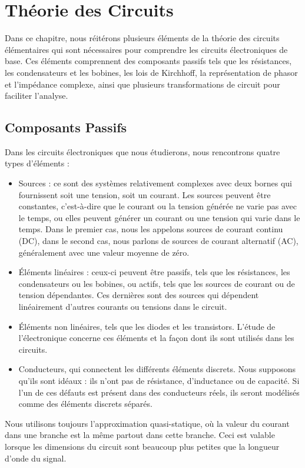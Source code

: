 \chapter{Théorie des Circuits}

Dans ce chapitre, nous réitérons plusieurs éléments de la théorie des circuits élémentaires qui sont nécessaires pour comprendre les circuits électroniques de base. Ces éléments comprennent des composants passifs tels que les résistances, les condensateurs et les bobines, les lois de Kirchhoff, la représentation de phasor et l'impédance complexe, ainsi que plusieurs transformations de circuit pour faciliter l'analyse.

\section{Composants Passifs}
Dans les circuits électroniques que nous étudierons, nous rencontrons quatre types d'éléments :
\begin{itemize}
	\item Sources : ce sont des systèmes relativement complexes avec deux bornes qui fournissent soit une tension, soit un courant. Les sources peuvent être constantes, c'est-à-dire que le courant ou la tension générée ne varie pas avec le temps, ou elles peuvent générer un courant ou une tension qui varie dans le temps. Dans le premier cas, nous les appelons sources de courant continu (DC), dans le second cas, nous parlons de sources de courant alternatif (AC), généralement avec une valeur moyenne de zéro.
	\item Éléments linéaires : ceux-ci peuvent être passifs, tels que les résistances, les condensateurs ou les bobines, ou actifs, tels que les sources de courant ou de tension dépendantes. Ces dernières sont des sources qui dépendent linéairement d'autres courants ou tensions dans le circuit.
	\item Éléments non linéaires, tels que les diodes et les transistors. L'étude de l'électronique concerne ces éléments et la façon dont ils sont utilisés dans les circuits.
	\item Conducteurs, qui connectent les différents éléments discrets. Nous supposons qu'ils sont idéaux : ils n'ont pas de résistance, d'inductance ou de capacité. Si l'un de ces défauts est présent dans des conducteurs réels, ils seront modélisés comme des éléments discrets séparés.
\end{itemize}
Nous utilisons toujours l'approximation quasi-statique, où la valeur du courant dans une branche est la même partout dans cette branche. Ceci est valable lorsque les dimensions du circuit sont beaucoup plus petites que la longueur d'onde du signal.



